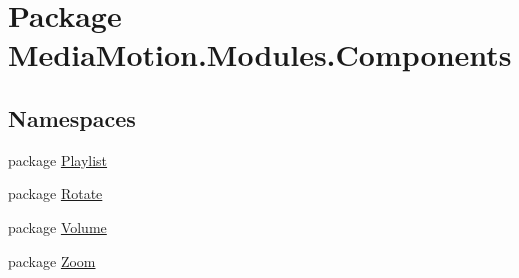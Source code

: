 \hypertarget{namespace_media_motion_1_1_modules_1_1_components}{\section{Package Media\+Motion.\+Modules.\+Components}
\label{namespace_media_motion_1_1_modules_1_1_components}
}
\subsection*{Namespaces}
\begin{DoxyCompactItemize}
\item 
package \hyperlink{namespace_media_motion_1_1_modules_1_1_components_1_1_playlist}{Playlist}
\item 
package \hyperlink{namespace_media_motion_1_1_modules_1_1_components_1_1_rotate}{Rotate}
\item 
package \hyperlink{namespace_media_motion_1_1_modules_1_1_components_1_1_volume}{Volume}
\item 
package \hyperlink{namespace_media_motion_1_1_modules_1_1_components_1_1_zoom}{Zoom}
\end{DoxyCompactItemize}
